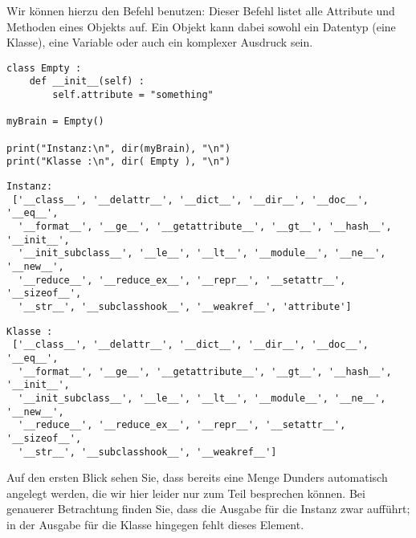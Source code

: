 Wir können hierzu den Befehl  benutzen: Dieser Befehl listet alle Attribute und Methoden eines Objekts auf. Ein Objekt kann dabei sowohl ein Datentyp (\ie eine Klasse), eine Variable oder auch ein komplexer Ausdruck sein.

\begin{codebox}
\begin{verbatim}
class Empty :
    def __init__(self) :
        self.attribute = "something"

myBrain = Empty()

print("Instanz:\n", dir(myBrain), "\n")
print("Klasse :\n", dir( Empty ), "\n")
\end{verbatim}
\end{codebox}

\begin{cmdbox}
\begin{verbatim}
Instanz:
 ['__class__', '__delattr__', '__dict__', '__dir__', '__doc__', '__eq__', 
  '__format__', '__ge__', '__getattribute__', '__gt__', '__hash__', '__init__', 
  '__init_subclass__', '__le__', '__lt__', '__module__', '__ne__', '__new__', 
  '__reduce__', '__reduce_ex__', '__repr__', '__setattr__', '__sizeof__', 
  '__str__', '__subclasshook__', '__weakref__', 'attribute'] 
\end{verbatim}
\end{cmdbox}
%
\begin{cmdbox}[]
\begin{verbatim}
Klasse :
 ['__class__', '__delattr__', '__dict__', '__dir__', '__doc__', '__eq__', 
  '__format__', '__ge__', '__getattribute__', '__gt__', '__hash__', '__init__', 
  '__init_subclass__', '__le__', '__lt__', '__module__', '__ne__', '__new__', 
  '__reduce__', '__reduce_ex__', '__repr__', '__setattr__', '__sizeof__', 
  '__str__', '__subclasshook__', '__weakref__']
\end{verbatim}
\end{cmdbox}
Auf den ersten Blick sehen Sie, dass bereits eine Menge Dunders automatisch angelegt werden, die wir hier leider nur zum Teil besprechen können. Bei genauerer Betrachtung finden Sie, dass die Ausgabe für die Instanz zwar  aufführt; in der Ausgabe für die Klasse hingegen fehlt dieses Element.

